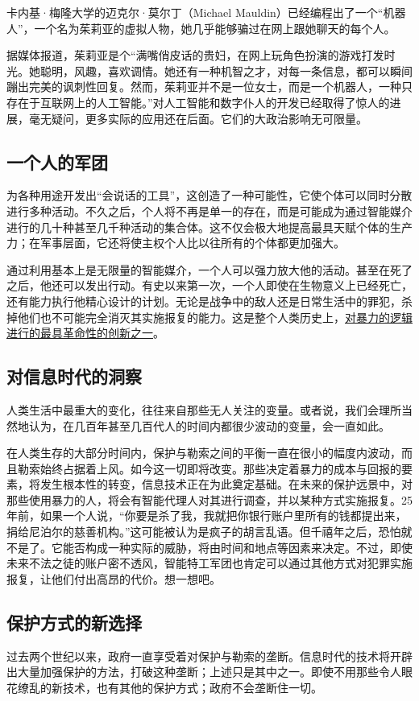 卡内基·梅隆大学的迈克尔·莫尔丁（Michael Mauldin）已经编程出了一个“机器人”，一个名为茱莉亚的虚拟人物，她几乎能够骗过在网上跟她聊天的每个人。

据媒体报道，茱莉亚是个“满嘴俏皮话的贵妇，在网上玩角色扮演的游戏打发时光。她聪明，风趣，喜欢调情。她还有一种机智之才，对每一条信息，都可以瞬间蹦出完美的讽刺性回复。然而，茱莉亚并不是一位女士，而是一个机器人，一种只存在于互联网上的人工智能。”对人工智能和数字仆人的开发已经取得了惊人的进展，毫无疑问，更多实际的应用还在后面。它们的大政治影响无可限量。

\subsection{一个人的军团}
为各种用途开发出“会说话的工具”，这创造了一种可能性，它使个体可以同时分散进行多种活动。不久之后，个人将不再是单一的存在，而是可能成为通过智能媒介进行的几十种甚至几千种活动的集合体。这不仅会极大地提高最具天赋个体的生产力；在军事层面，它还将使主权个人比以往所有的个体都更加强大。

通过利用基本上是无限量的智能媒介，一个人可以强力放大他的活动。甚至在死了之后，他还可以发出行动。有史以来第一次，一个人即使在生物意义上已经死亡，还有能力执行他精心设计的计划。无论是战争中的敌人还是日常生活中的罪犯，杀掉他们也不可能完全消灭其实施报复的能力。这是整个人类历史上，\uline{对暴力的逻辑进行的最具革命性的创新之一}。

\subsection{对信息时代的洞察}
人类生活中最重大的变化，往往来自那些无人关注的变量。或者说，我们会理所当然地认为，在几百年甚至几百代人的时间内都很少波动的变量，会一直如此。

在人类生存的大部分时间内，保护与勒索之间的平衡一直在很小的幅度内波动，而且勒索始终占据着上风。如今这一切即将改变。那些决定着暴力的成本与回报的要素，将发生根本性的转变，信息技术正在为此奠定基础。在未来的保护远景中，对那些使用暴力的人，将会有智能代理人对其进行调查，并以某种方式实施报复。25 年前，如果一个人说，“你要是杀了我，我就把你银行账户里所有的钱都提出来，捐给尼泊尔的慈善机构。”这可能被认为是疯子的胡言乱语。但千禧年之后，恐怕就不是了。它能否构成一种实际的威胁，将由时间和地点等因素来决定。不过，即使未来不法之徒的账户密不透风，智能特工军团也肯定可以通过其他方式对犯罪实施报复，让他们付出高昂的代价。想一想吧。

\subsection{保护方式的新选择}
过去两个世纪以来，政府一直享受着对保护与勒索的垄断。信息时代的技术将开辟出大量加强保护的方法，打破这种垄断；上述只是其中之一。即使不用那些令人眼花缭乱的新技术，也有其他的保护方式；政府不会垄断住一切。

